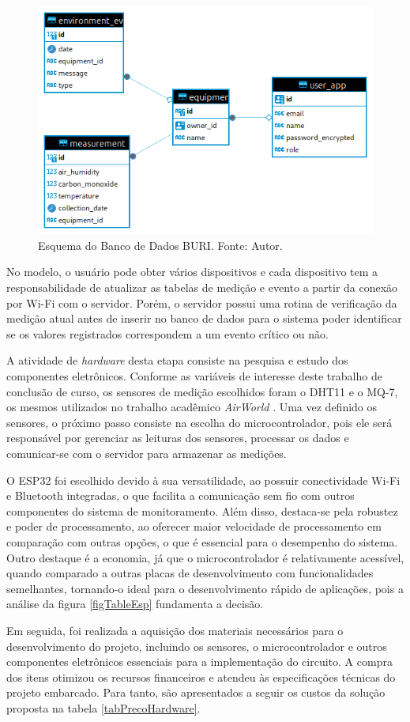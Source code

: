 \begin{figure}[ht]
    \centering
    \includegraphics[width=.54\textwidth]{img/buri_schema_bd.png}
    \caption{Esquema do Banco de Dados BURI. Fonte: Autor.}\label{figSchemaBuriDB}
\end{figure}

No modelo, o usuário pode obter vários dispositivos e cada dispositivo tem a responsabilidade de atualizar as tabelas de medição e evento 
a partir da conexão por Wi-Fi com o servidor. Porém, o servidor possui uma rotina de verificação da medição atual antes de inserir no banco de dados 
para o sistema poder identificar se os valores registrados correspondem a um evento crítico ou não. 

A atividade de \textit{hardware} desta etapa consiste na pesquisa e estudo dos componentes eletrônicos. Conforme as variáveis de interesse deste trabalho de 
conclusão de curso, os sensores de medição escolhidos foram o DHT11 e o MQ-7, os mesmos utilizados no trabalho acadêmico \textit{AirWorld} \cite{UFAMAirWorld}. Uma vez definido os sensores, 
o próximo passo consiste na escolha do microcontrolador, pois ele será responsável por gerenciar as leituras dos sensores, processar os dados e comunicar-se com o servidor para armazenar as medições.

O ESP32 foi escolhido devido à sua versatilidade, ao possuir conectividade Wi-Fi e Bluetooth integradas, o que facilita a comunicação sem fio com outros componentes do sistema de monitoramento. Além disso, destaca-se 
pela robustez e poder de processamento, ao oferecer maior velocidade de processamento em comparação com outras opções, o que é essencial para o desempenho do sistema. Outro destaque é a economia, já que o microcontrolador 
é relativamente acessível, quando comparado a outras placas de desenvolvimento com funcionalidades semelhantes, tornando-o ideal para o desenvolvimento rápido de aplicações, pois a análise da figura \ref{figTableEsp} fundamenta a decisão.

Em seguida, foi realizada a aquisição dos materiais necessários para o desenvolvimento do projeto, incluindo os sensores, o microcontrolador e outros componentes eletrônicos essenciais para a implementação do circuito. A compra dos itens 
otimizou os recursos financeiros e atendeu às especificações técnicas do projeto embarcado. Para tanto, são apresentados a seguir os custos da solução proposta na tabela \ref{tabPrecoHardware}.

